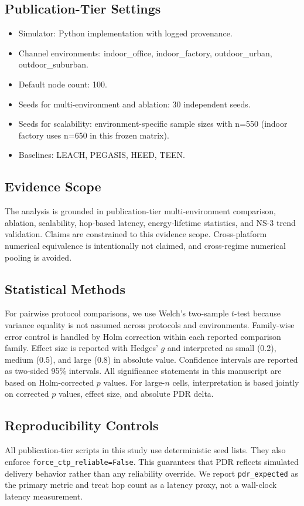 \documentclass[sensors,article,submit,moreauthors,pdftex]{Definitions/mdpi}
\begin{document}
\subsection{Publication-Tier Settings}
\begin{itemize}
\item Simulator: Python implementation with logged provenance.
\item Channel environments: indoor\_office, indoor\_factory, outdoor\_urban, outdoor\_suburban.
\item Default node count: 100.
\item Seeds for multi-environment and ablation: 30 independent seeds.
\item Seeds for scalability: environment-specific sample sizes with n=550 (indoor factory uses n=650 in this frozen matrix).
\item Baselines: LEACH, PEGASIS, HEED, TEEN.
\end{itemize}

\subsection{Evidence Scope}
The analysis is grounded in publication-tier multi-environment comparison, ablation, scalability, hop-based latency, energy-lifetime statistics, and NS-3 trend validation. Claims are constrained to this evidence scope. Cross-platform numerical equivalence is intentionally not claimed, and cross-regime numerical pooling is avoided.

\subsection{Statistical Methods}
For pairwise protocol comparisons, we use Welch's two-sample $t$-test because variance equality is not assumed across protocols and environments. Family-wise error control is handled by Holm correction within each reported comparison family. Effect size is reported with Hedges' $g$ and interpreted as small (0.2), medium (0.5), and large (0.8) in absolute value. Confidence intervals are reported as two-sided 95\% intervals. All significance statements in this manuscript are based on Holm-corrected $p$ values. For large-$n$ cells, interpretation is based jointly on corrected $p$ values, effect size, and absolute PDR delta.

\subsection{Reproducibility Controls}
All publication-tier scripts in this study use deterministic seed lists. They also enforce \texttt{force\_ctp\_reliable=False}. This guarantees that PDR reflects simulated delivery behavior rather than any reliability override. We report \texttt{pdr\_expected} as the primary metric and treat hop count as a latency proxy, not a wall-clock latency measurement.
\end{document}
